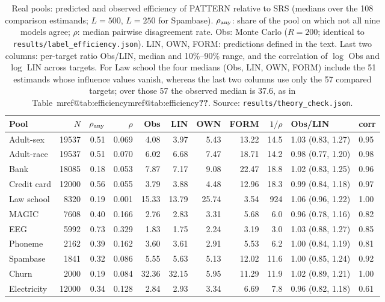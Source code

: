 \documentclass[pdflatex,sn-mathphys-num,iicol]{sn-jnl}
\makeatletter
\theoremstyle{thmstyleone}
\theoremstyle{thmstyletwo}
\theoremstyle{thmstylethree}
\newcommand{\Mref}[1]{\ifcsname mref@#1\endcsname\csname mref@#1\endcsname\else\textbf{??}\fi}
\makeatother
\begin{document}
\begin{table}[t]
\centering
\caption{Real pools: predicted and observed efficiency of PATTERN relative to SRS (medians over the
108 comparison estimands; $L=500$, $L=250$ for Spambase). $\rho_{\rm any}$: share of the pool on
which not all nine models agree; $\rho$: median pairwise disagreement rate. Obs: Monte Carlo
($R=200$; identical to \texttt{results/label\_efficiency.json}). LIN, OWN, FORM: predictions defined
in the text. Last two columns: per-target ratio Obs/LIN, median and 10\%--90\% range, and the
correlation of $\log$ Obs and $\log$ LIN across targets. For Law school the four medians (Obs, LIN, OWN, FORM) include the 51 estimands whose influence values vanish, whereas the last two columns use only the 57 compared targets; over those 57 the observed median is 37.6, as in Table~\Mref{tab:efficiency}. Source: \texttt{results/theory\_check.json}.}
\label{tab:sim-real}
\small
\begin{tabular}{lrrrrrrrrll}
\toprule
Pool & $N$ & $\rho_{\rm any}$ & $\rho$ & Obs & LIN & OWN & FORM & $1/\rho$ & Obs/LIN & corr\\
\midrule
Adult-sex & 19537 & 0.51 & 0.069 & 4.08 & 3.97 & 5.43 & 13.22 & 14.5 & 1.03 (0.83, 1.27) & 0.95\\
Adult-race & 19537 & 0.51 & 0.070 & 6.02 & 6.68 & 7.47 & 18.71 & 14.2 & 0.98 (0.77, 1.20) & 0.98\\
Bank & 18085 & 0.18 & 0.053 & 7.87 & 7.17 & 9.08 & 22.47 & 18.8 & 1.02 (0.83, 1.25) & 0.96\\
Credit card & 12000 & 0.56 & 0.055 & 3.79 & 3.88 & 4.48 & 12.96 & 18.3 & 0.99 (0.84, 1.18) & 0.97\\
Law school & 8320 & 0.19 & 0.001 & 15.33 & 13.79 & 25.74 & 3.54 & 924 & 1.06 (0.96, 1.22) & 1.00\\
MAGIC & 7608 & 0.40 & 0.166 & 2.76 & 2.83 & 3.31 & 5.68 & 6.0 & 0.96 (0.78, 1.16) & 0.82\\
EEG & 5992 & 0.73 & 0.329 & 1.83 & 1.75 & 2.24 & 3.19 & 3.0 & 1.03 (0.88, 1.27) & 0.85\\
Phoneme & 2162 & 0.39 & 0.162 & 3.60 & 3.61 & 2.91 & 5.53 & 6.2 & 1.00 (0.84, 1.19) & 0.81\\
Spambase & 1841 & 0.32 & 0.086 & 5.55 & 5.63 & 5.13 & 12.02 & 11.6 & 1.00 (0.85, 1.24) & 0.92\\
Churn & 2000 & 0.19 & 0.084 & 32.36 & 32.15 & 5.95 & 11.29 & 11.9 & 1.02 (0.89, 1.21) & 1.00\\
Electricity & 12000 & 0.34 & 0.128 & 2.84 & 2.93 & 3.34 & 6.69 & 7.8 & 0.96 (0.82, 1.18) & 0.61\\
\bottomrule
\end{tabular}
\end{table}
\end{document}

